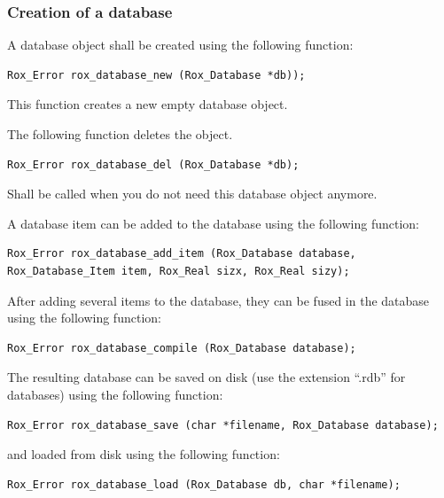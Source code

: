 
\subsubsection{Creation of a database}

\noindent A database object shall be created using the following function:

\begin{lstlisting}
Rox_Error rox_database_new (Rox_Database *db));
\end{lstlisting}

\noindent This function creates a new empty database object.

The following function deletes the object.

\begin{lstlisting}
Rox_Error rox_database_del (Rox_Database *db); 
\end{lstlisting}
Shall be called when you do not need this database object anymore.

A database item can be added to the database using the following function:

\begin{lstlisting}
Rox_Error rox_database_add_item (Rox_Database database, Rox_Database_Item item, Rox_Real sizx, Rox_Real sizy);
\end{lstlisting}

After adding several items to the database, they can be fused in the database using the following function:

\begin{lstlisting}
Rox_Error rox_database_compile (Rox_Database database);
\end{lstlisting}

The resulting database can be saved on disk (use the extension ``.rdb'' for databases) using the following function:

\begin{lstlisting}
Rox_Error rox_database_save (char *filename, Rox_Database database);
\end{lstlisting}

and loaded from disk using the following function:

\begin{lstlisting}
Rox_Error rox_database_load (Rox_Database db, char *filename);
\end{lstlisting}

